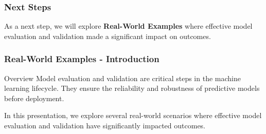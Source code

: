 \documentclass[aspectratio=169]{beamer}
\begin{document}
\begin{frame}
    \frametitle{Next Steps}
    As a next step, we will explore \textbf{Real-World Examples} where effective model evaluation and validation made a significant impact on outcomes.
\end{frame}

\begin{frame}[fragile]
    \frametitle{Real-World Examples - Introduction}
    \begin{block}{Overview}
        Model evaluation and validation are critical steps in the machine learning lifecycle. They ensure the reliability and robustness of predictive models before deployment. 
    \end{block}
    In this presentation, we explore several real-world scenarios where effective model evaluation and validation have significantly impacted outcomes.
\end{frame}
\end{document}
